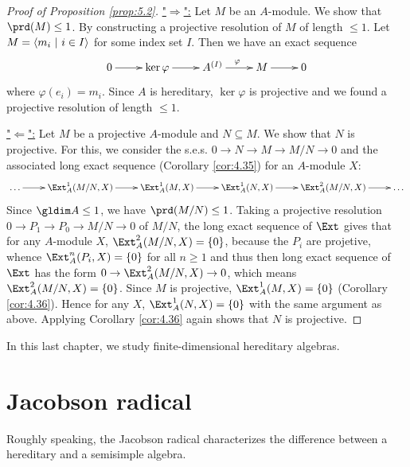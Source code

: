 \documentclass[twoside = false,	%
		headsepline,		%
		parskip = true,
		]{scrbook}						%
\begin{document}
    \begin{proof}[Proof of Proposition \ref{prop:5.2}]
        \underline{"$\Rightarrow$":}
            Let $M$ be an $A$-module. We show that $\prd(M) \leq 1$. By constructing a projective resolution of $M$ of length $\leq 1$. Let $M = \left\langle m_i \ | \ i \in I\right\rangle$ for some index set $I$. Then we have an exact sequence
            \begin{equation*}
            \xymatrix{
                0 \ar[r] & \ker \varphi \ar[r] & A^{(I)} \ar[r]^\varphi & M \ar[r] & 0
            }
            \end{equation*}
            where $\varphi(e_i) = m_i$. Since $A$ is hereditary, $\ker \varphi$ is projective and we found a projective resolution of length $\leq 1$.
            
        \underline{"$\Leftarrow$":}
            Let $M$ be a projective $A$-module and $N \subseteq M$. We show that $N$ is projective. For this, we consider the s.e.s. $0 \to N \to M \to M/N \to 0$ and the associated long exact sequence (Corollary \ref{cor:4.35}) for an $A$-module $X$:
            \begin{equation*}
            \xymatrix{
                \dots \ar[r] & \Ext_A^1(M/N,X) \ar[r] & \Ext_A^1(M,X) \ar[r] & \Ext_A^1(N,X) \ar[r] & \Ext_A^2(M/N,X) \ar[r] & \dots
            }
            \end{equation*}
            Since $\gldim A \leq 1$, we have $\prd(M/N) \leq 1$. Taking a projective resolution $0 \to P_1 \to P_0 \to M/N \to 0$ of $M/N$, the long exact sequence of $\Ext$ gives that for any $A$-module $X$, $\Ext_A^2(M/N,X) = \{0\}$, because the $P_i$ are projetive, whence $\Ext^n_A(P_i,X) = \{0\}$ for all $n \geq 1$ and thus then long exact sequence of $\Ext$ has the form $0 \to \Ext_A^2(M/N,X) \to 0$, which means $\Ext_A^2(M/N,X) = \{0\}$.
            Since $M$ is projective, $\Ext_A^1(M,X) = \{0\}$ (Corollary \ref{cor:4.36}). Hence for any $X$, $\Ext_A^1(N,X) = \{0\}$ with the same argument as above. Applying Corollary \ref{cor:4.36} again shows that $N$ is projective.
    \end{proof}

    In this last chapter, we study finite-dimensional hereditary algebras.

\section{Jacobson radical}
    Roughly speaking, the Jacobson radical characterizes the difference between a hereditary and a semisimple algebra.
\end{document}

